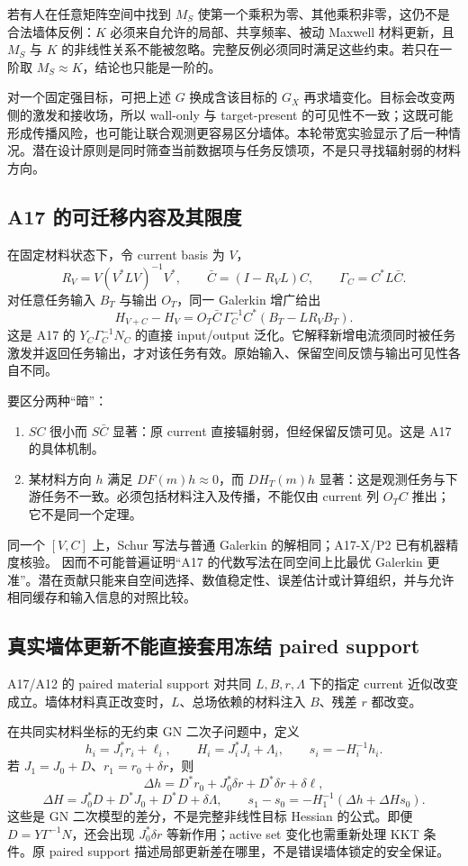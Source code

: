 若有人在任意矩阵空间中找到 $M_S$ 使第一个乘积为零、其他乘积非零，这仍不是合法墙体反例：$K$ 必须来自允许的局部、共享频率、被动 Maxwell 材料更新，且 $M_S$ 与 $K$ 的非线性关系不能被忽略。完整反例必须同时满足这些约束。若只在一阶取 $M_S\approx K$，结论也只能是一阶的。

对一个固定强目标，可把上述 $G$ 换成含该目标的 $G_X$ 再求墙变化。目标会改变两侧的激发和接收场，所以 wall-only 与 target-present 的可见性不一致；这既可能形成传播风险，也可能让联合观测更容易区分墙体。本轮带宽实验显示了后一种情况。潜在设计原则是同时筛查当前数据项与任务反馈项，不是只寻找辐射弱的材料方向。

\subsection{A17 的可迁移内容及其限度}
在固定材料状态下，令 current basis 为 $V$，
\[
R_V=V(V^*LV)^{-1}V^*,\qquad
\bar C=(I-R_VL)C,\qquad\Gamma_C=C^*L\bar C.
\]
对任意任务输入 $B_T$ 与输出 $O_T$，同一 Galerkin 增广给出
\[
\boxed{
H_{V+C}-H_V=
O_T\bar C\,\Gamma_C^{-1}
C^*(B_T-LR_VB_T).}
\]
这是 A17 的 $Y_C\Gamma_C^{-1}N_C$ 的直接 input/output 泛化。它解释新增电流须同时被任务激发并返回任务输出，才对该任务有效。原始输入、保留空间反馈与输出可见性各自不同。\cite{R_A17,R_A17core}

要区分两种“暗”：
\begin{enumerate}
\item $SC$ 很小而 $S\bar C$ 显著：原 current 直接辐射弱，但经保留反馈可见。这是 A17 的具体机制。
\item 某材料方向 $h$ 满足 $DF(m)h\approx0$，而 $DH_T(m)h$ 显著：这是观测任务与下游任务不一致。必须包括材料注入及传播，不能仅由 current 列 $O_TC$ 推出；它不是同一个定理。
\end{enumerate}

同一个 $[V,C]$ 上，Schur 写法与普通 Galerkin 的解相同；A17-X/P2 已有机器精度核验。\cite{R_A17X,R_P2} 因而不可能普遍证明“A17 的代数写法在同空间上比最优 Galerkin 更准”。潜在贡献只能来自空间选择、数值稳定性、误差估计或计算组织，并与允许相同缓存和输入信息的对照比较。

\subsection{真实墙体更新不能直接套用冻结 paired support}
A17/A12 的 paired material support 对共同 $L,B,r,\Lambda$ 下的指定 current 近似改变成立。墙体材料真正改变时，$L$、总场依赖的材料注入 $B$、残差 $r$ 都改变。

在共同实材料坐标的无约束 GN 二次子问题中，定义
\[
h_i=J_i^*r_i+\ell_i,\qquad
H_i=J_i^*J_i+\Lambda_i,\qquad s_i=-H_i^{-1}h_i.
\]
若 $J_1=J_0+D$、$r_1=r_0+\delta r$，则
\[
\Delta h=D^*r_0+J_0^*\delta r+D^*\delta r+\delta\ell,
\]
\[
\Delta H=J_0^*D+D^*J_0+D^*D+\delta\Lambda,\qquad
s_1-s_0=-H_1^{-1}(\Delta h+\Delta Hs_0).
\]
这些是 GN 二次模型的差分，不是完整非线性目标 Hessian 的公式。即便 $D=Y\Gamma^{-1}N$，还会出现 $J_0^*\delta r$ 等新作用；active set 变化也需重新处理 KKT 条件。原 paired support 描述局部更新差在哪里，不是错误墙体锁定的安全保证。

